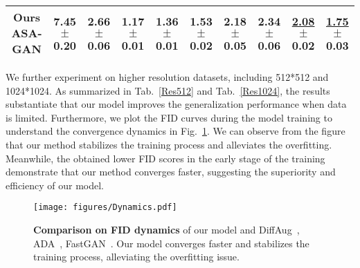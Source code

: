 \documentclass[10pt,journal,compsoc]{IEEEtran}
\begin{document}
\begin{table*}
{\begin{tabular}{ccc|ccccccc}
Ours ASA-GAN                                        & 7.45$\pm$0.20             & \textbf{2.66}$\pm$0.06    & \textbf{1.17}$\pm$0.01   & \textbf{1.36}$\pm$0.01    & \textbf{1.53}$\pm$0.02    & \textbf{2.18}$\pm$0.05         & \textbf{2.34}$\pm$0.06         & \underline{2.08}$\pm$0.02& \underline{1.75}$\pm$0.03       \\ \hline
\end{tabular}
}
\end{table*}

We further experiment on higher resolution datasets, including 512*512 and 1024*1024. As summarized in Tab.~\ref{Res512} and Tab.~\ref{Res1024},
the results substantiate that our model improves the generalization performance when data is limited.
Furthermore, we plot the FID curves during the model training to understand the convergence dynamics in Fig.~\ref{Dynamics}.
We can observe from the figure that our method stabilizes the training process and alleviates the overfitting.
Meanwhile, the obtained lower FID scores in the early stage of the training demonstrate that our method converges faster, suggesting the superiority and efficiency of our model.

\begin{figure}
  \centering
  \texttt{[image: figures/Dynamics.pdf]}
  \caption{\textbf{Comparison on FID dynamics} of our model and DiffAug~\cite{DiffAug}, ADA~\cite{karras2020training}, FastGAN~\cite{liu2021towards}. Our model converges faster and stabilizes the training process, alleviating the overfitting issue.}
  \label{Dynamics}
  \vspace{-1mm}
\end{figure}
\end{document}
